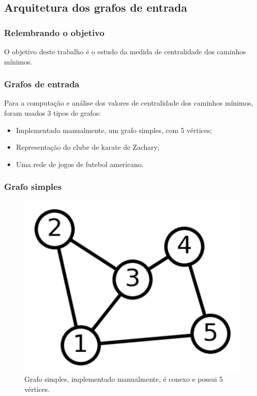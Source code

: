 \documentclass{beamer}
\begin{document}
    \subsection{Arquitetura dos grafos de entrada}
        \begin{frame}
            \frametitle{Relembrando o objetivo}
            O objetivo deste trabalho é o estudo da medida de centralidade dos caminhos mínimos.
        \end{frame}

        \begin{frame}
            \frametitle{Grafos de entrada}
            Para a computação e análise dos valores de centralidade dos caminhos mínimos, foram usados 3 tipos de grafos:
            \begin{itemize}
                \item Implementado manualmente, um grafo simples, com 5 vértices;
                \item Representação do clube de karate de Zachary;
                \item Uma rede de jogos de futebol americano.
            \end{itemize}
        \end{frame}

        \begin{frame}
            \frametitle{Grafo simples}
            \begin{figure}
                \centering
                \includegraphics[scale=0.35]{simple-graph.png}
                \caption{Grafo simples, implementado manualmente, é conexo e possui 5 vértices.}
            \end{figure}
        \end{frame}
\end{document}
